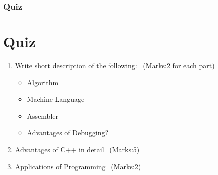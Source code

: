 \documentclass{beamer}
\begin{document}
\begin{frame}
	\frametitle{Quiz}
	\section{Quiz}
	\begin{enumerate}
		\item Write short description of the following: \ (Marks:2 for each part)
		\begin{itemize}
			\item Algorithm
			\item Machine Language
			\item Assembler
			\item Advantages of Debugging?
		\end{itemize}
		\item Advantages of C++ in detail \ (Marks:5)
		\item Applications of Programming \ (Marks:2)
	\end{enumerate}
\end{frame}
\end{document}

